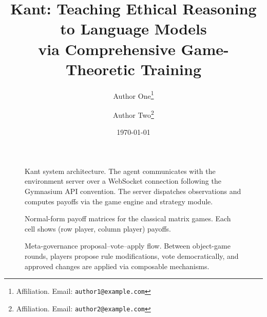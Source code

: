 \documentclass[11pt,a4paper]{article}
\title{Kant: Teaching Ethical Reasoning to Language Models\\
via Comprehensive Game-Theoretic Training}
\author{
    Author One\thanks{Affiliation. Email: \texttt{author1@example.com}} \and
    Author Two\thanks{Affiliation. Email: \texttt{author2@example.com}}
}
\date{\today}
\begin{document}
\maketitle





\begin{figure}[t]
    \centering
    
    \caption{Kant system architecture. The agent communicates with the
    environment server over a WebSocket connection following the Gymnasium API
    convention. The server dispatches observations and computes payoffs via the
    game engine and strategy module.}
    \label{fig:architecture}
\end{figure}





\begin{figure}[t]
    \centering
    
    \caption{Normal-form payoff matrices for the classical matrix games.
    Each cell shows (row player, column player) payoffs.}
    \label{fig:payoff-matrices}
\end{figure}







\begin{figure}[t]
    \centering
    
    \caption{Meta-governance proposal--vote--apply flow. Between object-game
    rounds, players propose rule modifications, vote democratically, and
    approved changes are applied via composable mechanisms.}
    \label{fig:governance-flow}
\end{figure}




\end{document}
